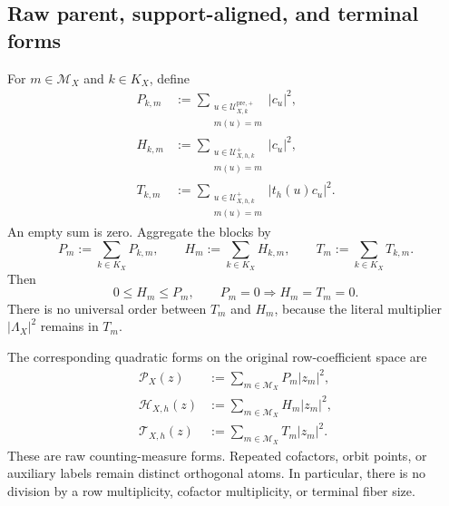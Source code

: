 \subsection{Raw parent, support-aligned, and terminal forms}

For \(m\in\mathcal M_X\) and \(k\in K_X\), define
\begin{align}
 P_{k,m}
 &:=
 \sum_{\substack{u\in\mathcal U_{X,k}^{\mathrm{pre},+}\\m(u)=m}}
 |c_u|^2,
 \label{eq:tpc64-block-parent-weight}\\
 H_{k,m}
 &:=
 \sum_{\substack{u\in\mathcal U_{X,h,k}^{+}\\m(u)=m}}
 |c_u|^2,
 \label{eq:tpc64-block-aligned-weight}\\
 T_{k,m}
 &:=
 \sum_{\substack{u\in\mathcal U_{X,h,k}^{+}\\m(u)=m}}
 |t_h(u)c_u|^2.
 \label{eq:tpc64-block-terminal-weight}
\end{align}
An empty sum is zero.  Aggregate the blocks by
\begin{equation}
 P_m:=\sum_{k\in K_X}P_{k,m},\qquad
 H_m:=\sum_{k\in K_X}H_{k,m},\qquad
 T_m:=\sum_{k\in K_X}T_{k,m}.
 \label{eq:tpc64-aggregate-row-weights}
\end{equation}
Then
\begin{equation}
 0\le H_m\le P_m,\qquad
 P_m=0\Longrightarrow H_m=T_m=0.
 \label{eq:tpc64-row-weight-order}
\end{equation}
There is no universal order between \(T_m\) and \(H_m\), because the
literal multiplier \(\lvert\Lambda_X\rvert^2\) remains in \(T_m\).

The corresponding quadratic forms on the original row-coefficient space
are
\begin{align}
 \mathcal P_X(z)
 &:=\sum_{m\in\mathcal M_X}P_m|z_m|^2,
 \label{eq:tpc64-literal-parent-form}\\
 \mathcal H_{X,h}(z)
 &:=\sum_{m\in\mathcal M_X}H_m|z_m|^2,
 \label{eq:tpc64-literal-aligned-form}\\
 \mathcal T_{X,h}(z)
 &:=\sum_{m\in\mathcal M_X}T_m|z_m|^2.
 \label{eq:tpc64-literal-terminal-form}
\end{align}
These are raw counting-measure forms.  Repeated cofactors, orbit points,
or auxiliary labels remain distinct orthogonal atoms.  In particular,
there is no division by a row multiplicity, cofactor multiplicity, or
terminal fiber size.

